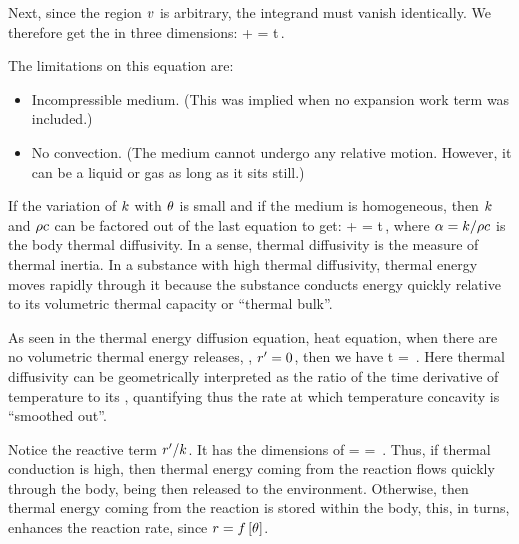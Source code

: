 Next, since the region $v$ is arbitrary, the integrand must vanish identically. We therefore get the  in three dimensions:
\beq
\gder\iprod\kthcond\gder\temp + \flow\chthen = \ipd t\dens\kshcap\temp\,.
\eeq

The limitations on this equation are:
\begin{itemize}
\item Incompressible medium. (This was implied when no expansion work term was included.)
%
\item No convection. (The medium cannot undergo any relative motion. However, it can be a liquid or gas as long as it sits still.)
\end{itemize}

If the variation of $k$ with $\theta$ is small and if the medium is homogeneous, then $k$ and $\rho c$ can be factored out of the last equation to get:
\beq
\lder\temp + \flow\chthen = \ipd t\temp\,,
\eeq
where $\alpha = k/\rho c$ is the body thermal diffusivity. In a sense, thermal diffusivity is the measure of thermal inertia. In a substance with high thermal diffusivity, thermal energy moves rapidly through it because the substance conducts energy quickly relative to its volumetric thermal capacity or ``thermal bulk''.

\begin{geometry}
As seen in the thermal energy diffusion equation, \aka heat equation, when there are no volumetric thermal energy releases, \ie, ${r}^{\prime} = 0$, then we have
\beq
\cder\temp t = \kthdiff\cder\temp{\pos\pos}\,.
\eeq
Here thermal diffusivity can be geometrically interpreted as the ratio of the time derivative of temperature to its , quantifying thus the rate at which temperature concavity is ``smoothed out''.
\end{geometry}

\begin{technote}
Notice the reactive term ${r}^{\prime}/k$. It has the dimensions of
\beq
\dim\dfrac{\flow\chthen}{\kthcond} = 
    = \,.
\eeq
Thus, if thermal conduction is high, then thermal energy coming from the reaction flows quickly through the body, being then released to the environment. Otherwise, then thermal energy coming from the reaction is stored within the body, this, in turns, enhances the reaction rate, since $r = f\left[{\theta}\right]$.
\end{technote}


